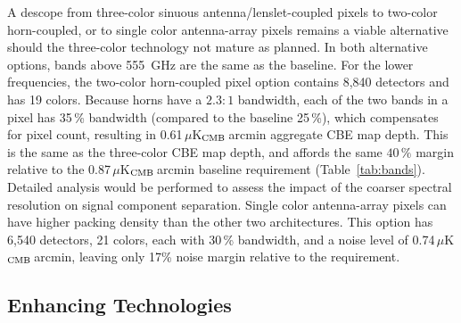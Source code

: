 A descope from three-color sinuous antenna/lenslet-coupled pixels to two-color horn-coupled, or to single color antenna-array pixels remains a viable alternative should the three-color technology not mature as planned. In both alternative options, bands above 555~GHz are the same as the baseline. For the lower frequencies, the two-color horn-coupled pixel option contains 8,840 detectors and has 19 colors. Because horns have a $2.3:1$ bandwidth, each of the two bands in a pixel has 35\,\% bandwidth (compared to the baseline 25\,\%), which compensates for pixel count, resulting in 0.61\,$\mu$K$_{\rm CMB}$\,arcmin aggregate CBE map depth. This is the same as the three-color CBE map depth, and affords the same $40\,\%$ margin relative to the 0.87\,$\mu$K$_{\rm CMB}$\,arcmin baseline requirement (Table~\ref{tab:bands}). Detailed analysis would be performed to assess the impact of the coarser spectral resolution on signal component separation. Single color antenna-array pixels can have higher packing density than the other two architectures. This option has 6,540 detectors, 21 colors, each with 30\,\% bandwidth, and a noise level of 0.74\,$\mu$K$_{\rm CMB}$\,arcmin, leaving only 17\% noise margin relative to the requirement. 


\subsection{Enhancing Technologies}
\label{sec:enhancing_technologies} %

